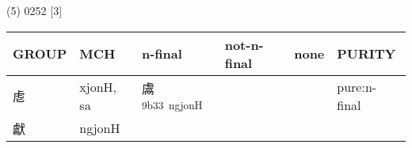 \documentclass[14pt,a4paper]{scrartcl}
\begin{document}
(5) 0252 {[}3{]}

\begin{longtable}[c]{@{}llllll@{}}
\toprule
\begin{minipage}[b]{0.14\columnwidth}\raggedright\strut
GROUP
\strut\end{minipage} &
\begin{minipage}[b]{0.14\columnwidth}\raggedright\strut
MCH
\strut\end{minipage} &
\begin{minipage}[b]{0.14\columnwidth}\raggedright\strut
n-final
\strut\end{minipage} &
\begin{minipage}[b]{0.14\columnwidth}\raggedright\strut
not-n-final
\strut\end{minipage} &
\begin{minipage}[b]{0.14\columnwidth}\raggedright\strut
none
\strut\end{minipage} &
\begin{minipage}[b]{0.14\columnwidth}\raggedright\strut
PURITY
\strut\end{minipage}\tabularnewline
\midrule
\endhead
\begin{minipage}[t]{0.14\columnwidth}\raggedright\strut
䖈
\strut\end{minipage} &
\begin{minipage}[t]{0.14\columnwidth}\raggedright\strut
xjonH, sa
\strut\end{minipage} &
\begin{minipage}[t]{0.14\columnwidth}\raggedright\strut
鬳\textsuperscript{9b33~ngjonH}
\strut\end{minipage} &
\begin{minipage}[t]{0.14\columnwidth}\raggedright\strut
\strut\end{minipage} &
\begin{minipage}[t]{0.14\columnwidth}\raggedright\strut
\strut\end{minipage} &
\begin{minipage}[t]{0.14\columnwidth}\raggedright\strut
pure:n-final
\strut\end{minipage}\tabularnewline
\begin{minipage}[t]{0.14\columnwidth}\raggedright\strut
獻
\strut\end{minipage} &
\begin{minipage}[t]{0.14\columnwidth}\raggedright\strut
ngjonH
\strut\end{minipage} &
\begin{minipage}[t]{0.14\columnwidth}\raggedright\strut

\end{minipage}
\end{longtable}
\end{document}
